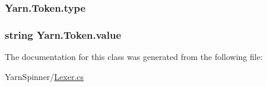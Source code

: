 \hypertarget{a00079_a471a25da67fda0524f2375f9a882aafa}{
\subsubsection[{type}]{ Yarn.\-Token.\-type}}\label{a00079_a471a25da67fda0524f2375f9a882aafa}
\hypertarget{a00079_a3df6b32d6190a639619a3f064c2154e2}{
\subsubsection[{value}]{\setlength{\rightskip}{0pt plus 5cm}string Yarn.\-Token.\-value}}\label{a00079_a3df6b32d6190a639619a3f064c2154e2}


The documentation for this class was generated from the following file\-:\begin{DoxyCompactItemize}
\item 
Yarn\-Spinner/\hyperlink{a00119}{Lexer.\-cs}\end{DoxyCompactItemize}
